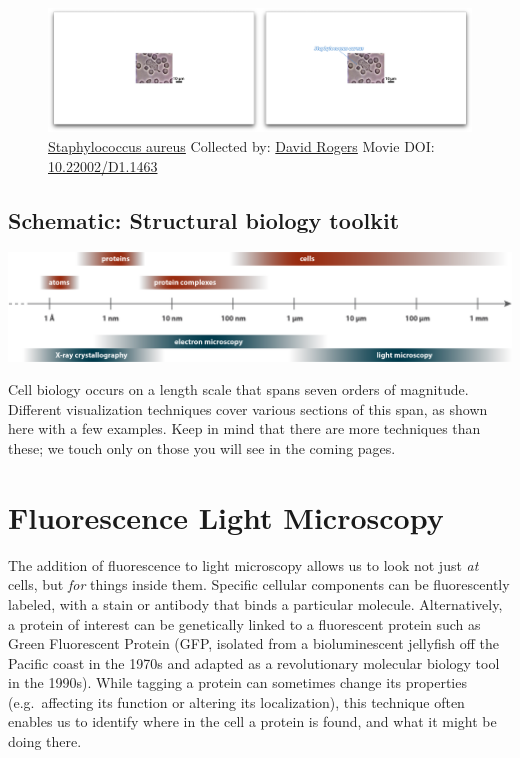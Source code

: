 \documentclass[]{tufte-book}
\begin{document}
\begin{figure}
\includegraphics{movie_stills/1_1} \caption[\protect\hyperlink{tree}{Staphylococcus aureus} Collected by:
\protect\hyperlink{david_rogers}{David Rogers} Movie DOI:
\href{https://doi.org/10.22002/D1.1463}{10.22002/D1.1463}]{\protect\hyperlink{tree}{Staphylococcus aureus} Collected by:
\protect\hyperlink{david_rogers}{David Rogers} Movie DOI:
\href{https://doi.org/10.22002/D1.1463}{10.22002/D1.1463}}\label{fig:1-1}
\end{figure}

\hypertarget{Structural_biology_toolkit}{\subsection*{Schematic:
Structural biology toolkit}\label{Structural_biology_toolkit}}

\includegraphics{img/schematics/1_1_1}

Cell biology occurs on a length scale that spans seven orders of
magnitude. Different visualization techniques cover various sections of
this span, as shown here with a few examples. Keep in mind that there
are more techniques than these; we touch only on those you will see in
the coming pages.

\section{Fluorescence Light
Microscopy}\label{fluorescence-light-microscopy}

The addition of fluorescence to light microscopy allows us to look not
just \emph{at} cells, but \emph{for} things inside them. Specific
cellular components can be fluorescently labeled, with a stain or
antibody that binds a particular molecule. Alternatively, a protein of
interest can be genetically linked to a fluorescent protein such as
Green Fluorescent Protein (GFP, isolated from a bioluminescent jellyfish
off the Pacific coast in the 1970s and adapted as a revolutionary
molecular biology tool in the 1990s). While tagging a protein can
sometimes change its properties (e.g.~affecting its function or altering
its localization), this technique often enables us to identify where in
the cell a protein is found, and what it might be doing there.
\end{document}
